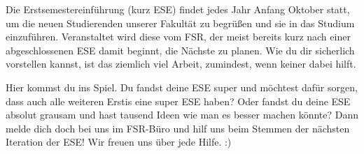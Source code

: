 
Die Erstsemestereinführung (kurz ESE) findet jedes Jahr Anfang Oktober statt, um die neuen Studierenden unserer Fakultät zu begrüßen und sie in das Studium einzuführen.
Veranstaltet wird diese vom FSR, der meist bereits kurz nach einer abgeschlossenen ESE damit beginnt, die Nächste zu planen.
Wie du dir sicherlich vorstellen kannst, ist das ziemlich viel Arbeit, zumindest, wenn keiner dabei hilft.

Hier kommst du ins Spiel. Du fandst deine ESE super und möchtest dafür sorgen, dass auch alle weiteren Erstis eine super ESE haben?
Oder fandst du deine ESE absolut grausam und hast tausend Ideen wie man es besser machen könnte?
Dann melde dich doch bei uns im FSR-Büro und hilf uns beim Stemmen der nächsten Iteration der ESE! Wir freuen uns über jede Hilfe. :)



